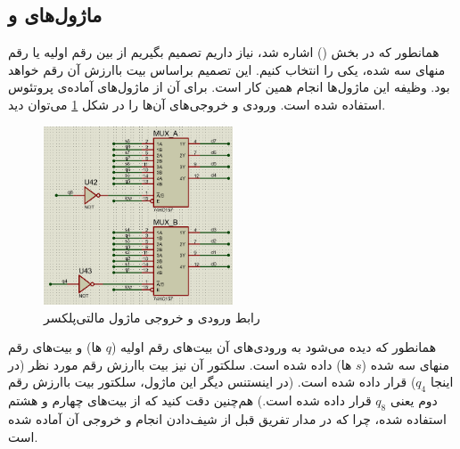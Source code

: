 \documentclass[12pt,onecolumn,a4paper,fleqn]{article}
\begin{document}
	\subsection{ماژول‌های  و }
	\label{sec:mux}
	همانطور که در بخش
	()
	اشاره شد، نیاز داریم تصمیم بگیریم از بین رقم اولیه یا رقم منهای سه شده، یکی را انتخاب کنیم. این تصمیم براساس بیت باارزش آن رقم خواهد بود. وظیفه این ماژول‌ها انجام همین کار است. برای آن از ماژول‌های آماده‌ی پروتئوس استفاده شده است. ورودی و خروجی‌های آن‌ها را در شکل \ref{fig:mux} می‌توان دید.
	\begin{figure}[H]
		\centering
		\includegraphics[width=0.5\textwidth]{source/mux.png}
		\caption{رابط ورودی و خروجی ماژول مالتی‌پلکسر}
		\label{fig:mux}
	\end{figure}
	همانطور که دیده می‌شود به ورودی‌های آن بیت‌های رقم اولیه ($q$ ها) و بیت‌های رقم منهای سه شده ($s$ ها) داده شده است. سلکتور آن نیز بیت باارزش رقم مورد نظر (در اینجا $q_4$) قرار داده شده است. (در اینستنس دیگر این ماژول، ‌سلکتور بیت باارزش رقم دوم یعنی $q_8$ قرار داده شده است.) هم‌چنین دقت کنید که از بیت‌های چهارم و هشتم استفاده شده، چرا که در مدار تفریق قبل از شیف‌دادن انجام و خروجی آن آماده شده است.
\end{document}
